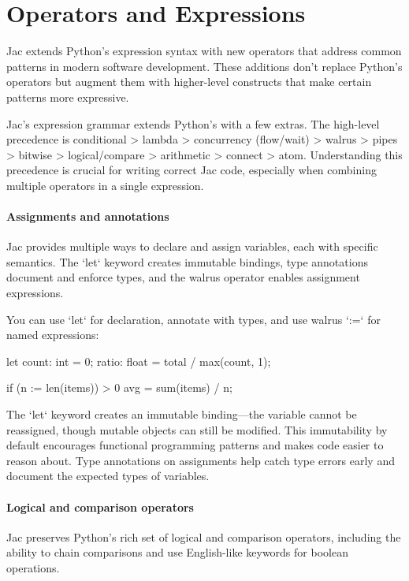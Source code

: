 \section{Operators and Expressions}

Jac extends Python's expression syntax with new operators that address common patterns in modern software development. These additions don't replace Python's operators but augment them with higher-level constructs that make certain patterns more expressive.

Jac's expression grammar extends Python's with a few extras. The high-level precedence is conditional > lambda > concurrency (flow/wait) > walrus > pipes > bitwise > logical/compare > arithmetic > connect > atom. Understanding this precedence is crucial for writing correct Jac code, especially when combining multiple operators in a single expression.

\paragraph{Assignments and annotations}

Jac provides multiple ways to declare and assign variables, each with specific semantics. The `let` keyword creates immutable bindings, type annotations document and enforce types, and the walrus operator enables assignment expressions.

You can use `let` for declaration, annotate with types, and use walrus `:=` for named expressions:

\begin{jacblock}
let count: int = 0;
ratio: float = total / max(count, 1);

if (n := len(items)) > 0 {
    avg = sum(items) / n;
}
\end{jacblock}

The `let` keyword creates an immutable binding—the variable cannot be reassigned, though mutable objects can still be modified. This immutability by default encourages functional programming patterns and makes code easier to reason about. Type annotations on assignments help catch type errors early and document the expected types of variables.

\paragraph{Logical and comparison operators}

Jac preserves Python's rich set of logical and comparison operators, including the ability to chain comparisons and use English-like keywords for boolean operations.

